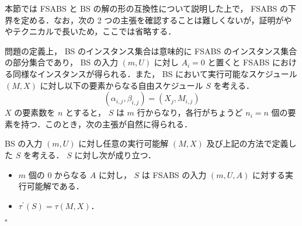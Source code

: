 本節では FSABS と BS の解の形の互換性について説明した上で， FSABS の下界を定める．なお，次の 2 つの主張を確認することは難しくないが，証明がややテクニカルで長いため，ここでは省略する．

問題の定義上， BS のインスタンス集合は意味的に FSABS のインスタンス集合の部分集合であり， BS の入力 $(m, U)$ に対し $A_i = 0$ と置くと FSABS における同様なインスタンスが得られる．また， BS において実行可能なスケジュール $(M, X)$ に対し以下の要素からなる自由スケジュール $S$ を考える．
\begin{equation}
  (\alpha_{i,j}, \beta_{i,j}) = (X_j, M_{i,j})
\end{equation}
$X$ の要素数を $n$ とすると， $S$ は $m$ 行からなり，各行がちょうど $n_i = n$ 個の要素を持つ．このとき，次の主張が自然に得られる．
\begin{claim}\label{claim:bs-to-fsabs}
  BS の入力 $(m, U)$ に対し任意の実行可能解 $(M, X)$ 及び上記の方法で定義した $S$ を考える． $S$ に対し次が成り立つ．
  \begin{itemize}
  \item $m$ 個の 0 からなる $A$ に対し， $S$ は FSABS の入力 $(m, U, A)$ に対する実行可能解である．
  \item $\tau^\prime(S) = \tau(M, X)$．
  \end{itemize}
  \hfill $\square$
\end{claim}

